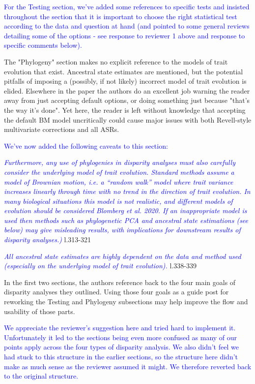 \documentclass[12pt,letterpaper]{article}
\begin{document}
\textcolor{blue}{For the Testing section, we've added some references to specific tests and insisted throughout the section that it is important to choose the right statistical test according to the data and question at hand (and pointed to some general reviews detailing some of the options - see response to reviewer 1 above and response to specific comments below).}

\noindent The "Phylogeny" section makes no explicit reference to the models of trait evolution that exist. Ancestral state estimates are mentioned, but the potential pitfalls of imposing a (possibly, if not likely) incorrect model of trait evolution is elided. Elsewhere in the paper the authors do an excellent job warning the reader away from just accepting default options, or doing something just because "that's the way it's done". Yet here, the reader is left without knowledge that accepting the default BM model uncritically could cause major issues with both Revell-style multivariate corrections and all ASRs.

\textcolor{blue}{We've now added the following caveats to this section:}

\textcolor{blue}{\textit{Furthermore, any use of phylogenies in disparity analyses must also carefully consider the underlying model of trait evolution. Standard methods assume a model of Brownian motion, i.e. a ``random walk'' model where trait variance increases linearly through time with no trend in the direction of trait evolution. In many biological situations this model is not realistic, and different models of evolution should be considered Blomberg et al. 2020. If an inappropriate model is used then methods such as phylogenetic PCA and ancestral state estimations (see below) may give misleading results, with implications for downstream results of disparity analyses.)}} l.313-321 %

\textcolor{blue}{\textit{All ancestral state estimates are highly dependent on the data and method used (especially on the underlying model of trait evolution).}} l.338-339 %

\noindent In the first two sections, the authors reference back to the four main goals of disparity analyses they outlined. Using those four goals as a guide post for reworking the Testing and Phylogeny subsections may help improve the flow and usability of those parts.

\textcolor{blue}{We appreciate the reviewer's suggestion here and tried hard to implement it. Unfortunately it led to the sections being even more confused as many of our points apply across the four types of disparity analysis. We also didn't feel we had stuck to this structure in the earlier sections, so the structure here didn't make as much sense as the reviewer assumed it might. We therefore reverted back to the original structure.}
\end{document}
